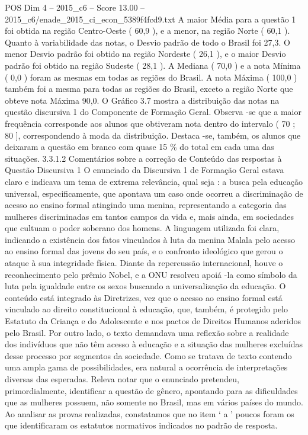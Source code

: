 \begin{textsample}{POS Dim 4 – 2015\_c6 – Score 13.00 – 2015\_c6/enade\_2015\_ci\_econ\_5389f4fcd9.txt}
A maior Média para a questão 1 foi obtida na região Centro-Oeste ( 60,9 ), e a menor, na região Norte ( 60,1 ).
Quanto à variabilidade das notas, o Desvio padrão de todo o Brasil foi 27,3.
O menor Desvio padrão foi obtido na região Nordeste ( 26,1 ), e o maior Desvio padrão foi obtido na região Sudeste ( 28,1 ).
A Mediana ( 70,0 ) e a nota Mínima ( 0,0 ) foram as mesmas em todas as regiões do Brasil.
A nota Máxima ( 100,0 ) também foi a mesma para todas as regiões do Brasil, exceto a região Norte que obteve nota Máxima 90,0.
O Gráfico 3.7 mostra a distribuição das notas na questão discursiva 1 do Componente de Formação Geral.
Observa -se que a maior frequência corresponde aos alunos que obtiveram nota dentro do intervalo ( 70 ; 80 ], correspondendo à moda da distribuição.
Destaca -se, também, os alunos que deixaram a questão em branco com quase 15 \% do total em cada uma das situações. 3.3.1.2 Comentários sobre a correção de Conteúdo das respostas à Questão Discursiva 1 O enunciado da Discursiva 1 de Formação Geral estava claro e indicava um tema de extrema relevância, qual seja : a busca pela educação universal, especificamente, que apontava um caso onde ocorreu a discriminação de acesso ao ensino formal atingindo uma menina, representando a categoria das mulheres discriminadas em tantos campos da vida e, mais ainda, em sociedades que cultuam o poder soberano dos homens.
A linguagem utilizada foi clara, indicando a existência dos fatos vinculados à luta da menina Malala pelo acesso ao ensino formal das jovens do seu país, e o confronto ideológico que gerou o ataque à sua integridade física.
Diante da repercussão internacional, houve o reconhecimento pelo prêmio Nobel, e a ONU resolveu apoiá -la como símbolo da luta pela igualdade entre os sexos buscando a universalização da educação.
O conteúdo está integrado às Diretrizes, vez que o acesso ao ensino formal está vinculado ao direito constitucional à educação, que, também, é protegido pelo Estatuto da Criança e do Adolescente e nos pactos de Direitos Humanos aderidos pelo Brasil.
Por outro lado, o texto demandava uma reflexão sobre a realidade dos indivíduos que não têm acesso à educação e a situação das mulheres excluídas desse processo por segmentos da sociedade.
Como se tratava de texto contendo uma ampla gama de possibilidades, era natural a ocorrência de interpretações diversas das esperadas.
Releva notar que o enunciado pretendeu, primordialmente, identificar a questão de gênero, apontando para as dificuldades que as mulheres possuem, não somente no Brasil, mas em vários países do mundo.
Ao analisar as provas realizadas, constatamos que no item ‘ a ’ poucos foram os que identificaram os estatutos normativos indicados no padrão de resposta.

\end{textsample}
